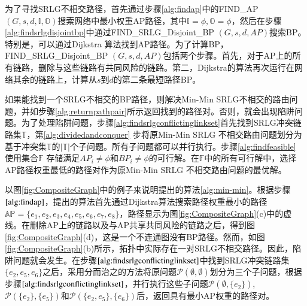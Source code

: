为了寻找SRLG不相交路径，首先通过步骤\ref{alg:findap}中的FIND\_AP$(G,s,d, \mathbb{I},\mathbb{O})$搜索网络中最小权重AP路径，其中$\mathbb{I}=\phi,\mathbb{O}=\phi$，然后在步骤\ref{alg:findsrlgdisjointbp}中通过FIND\_SRLG\_Disjoint\_BP
$(G,s,d,AP)$搜索BP。特别是，可以通过Dijkstra 算法找到AP路径。为了计算BP，FIND\_SRLG\_Disjoint\_BP
$(G,s,d,AP)$包括两个步骤。首先，对于AP上的所有链路，删除与这些链路有共同风险的链路。第二，Dijkstra的算法再次运行在网络其余的链路上，计算从$s$到$d$的第二条最短路径BP。

如果能找到一个SRLG不相交的BP路径，则解决Min-Min SRLG不相交的路由问题，并如步骤\ref{alg:returnpathpair}所示返回找到的路径对。否则，就会出现陷阱问题。为了处理陷阱问题，步骤\ref{alg:findsrlgconflictinglinkset}首先找到SRLG冲突链路集$\mathbb{T}$，第\ref{alg:dividedandconquer} 步将原Min-Min SRLG 不相交路由问题划分为基于冲突集$\mathbb{T}$的$\left| \mathbb{T} \right|$个子问题。所有子问题都可以并行执行。步骤\ref{alg:findfeasible} 使用集合$\mathbb{F}$ 存储满足$A{P_i} \ne \phi$和$B{P_i} \ne \phi$的可行解。在$\mathbb{F}$中的所有可行解中，选择AP路径权重最低的路径对作为原Min-Min SRLG 不相交路由问题的最优解。

以图\ref{fig:CompositeGraph}中的例子来说明提出的算法\ref{alg:min-min}。根据步骤$\ref{alg:findap}$，提出的算法首先通过Dijkstra算法搜索路径权重最小的路径$\mathbb{AP}=\{e_1,e_2,e_3,e_4,e_5,e_6,e_7,e_8\}$，路径显示为图\ref{fig:CompositeGraph}(c)中的虚线。在删除AP上的链路以及与AP共享共同风险的链路之后，得到图\ref{fig:CompositeGraph}(d)，这是一个不连通图没有BP路径。然而，如图\ref{fig:CompositeGraph}(b)所示，拓扑中实际存在一对SRLG不相交路径。因此，陷阱问题就会发生。在步骤$\ref{alg:findsrlgconflictinglinkset}$中找到SRLG冲突链路集$\{e_2,e_5,e_6\}$之后，采用分而治之的方法将原问题${\mathcal P}(\emptyset ,\emptyset )$划分为三个子问题，根据步骤$\ref{alg:findsrlgconflictinglinkset}$，并行执行这些子问题${\mathcal P}(\emptyset ,\{e_2\} )$, ${\mathcal P}(\{e_2\} ,\{e_5\} )$和${\mathcal P}(\{e_2,e_5\} ,\{e_6\} )$后，返回具有最小AP权重的路径对。


